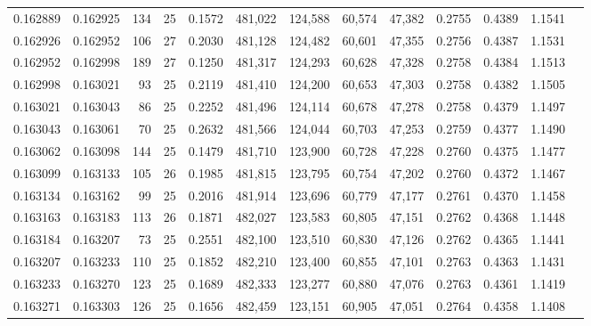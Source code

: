 \begin{tabular}{rrrrrrrrrrrrr}
0.162889 & 0.162925 & 134 &  25 &                                     0.1572 & 481,022 & 124,588 &  60,574 &  47,382 & 0.2755 & 0.4389 & 1.1541 \\
0.162926 & 0.162952 & 106 &  27 &                                     0.2030 & 481,128 & 124,482 &  60,601 &  47,355 & 0.2756 & 0.4387 & 1.1531 \\
0.162952 & 0.162998 & 189 &  27 &                                     0.1250 & 481,317 & 124,293 &  60,628 &  47,328 & 0.2758 & 0.4384 & 1.1513 \\
0.162998 & 0.163021 &  93 &  25 &                                     0.2119 & 481,410 & 124,200 &  60,653 &  47,303 & 0.2758 & 0.4382 & 1.1505 \\
0.163021 & 0.163043 &  86 &  25 &                                     0.2252 & 481,496 & 124,114 &  60,678 &  47,278 & 0.2758 & 0.4379 & 1.1497 \\
0.163043 & 0.163061 &  70 &  25 &                                     0.2632 & 481,566 & 124,044 &  60,703 &  47,253 & 0.2759 & 0.4377 & 1.1490 \\
0.163062 & 0.163098 & 144 &  25 &                                     0.1479 & 481,710 & 123,900 &  60,728 &  47,228 & 0.2760 & 0.4375 & 1.1477 \\
0.163099 & 0.163133 & 105 &  26 &                                     0.1985 & 481,815 & 123,795 &  60,754 &  47,202 & 0.2760 & 0.4372 & 1.1467 \\
0.163134 & 0.163162 &  99 &  25 &                                     0.2016 & 481,914 & 123,696 &  60,779 &  47,177 & 0.2761 & 0.4370 & 1.1458 \\
0.163163 & 0.163183 & 113 &  26 &                                     0.1871 & 482,027 & 123,583 &  60,805 &  47,151 & 0.2762 & 0.4368 & 1.1448 \\
0.163184 & 0.163207 &  73 &  25 &                                     0.2551 & 482,100 & 123,510 &  60,830 &  47,126 & 0.2762 & 0.4365 & 1.1441 \\
0.163207 & 0.163233 & 110 &  25 &                                     0.1852 & 482,210 & 123,400 &  60,855 &  47,101 & 0.2763 & 0.4363 & 1.1431 \\
0.163233 & 0.163270 & 123 &  25 &                                     0.1689 & 482,333 & 123,277 &  60,880 &  47,076 & 0.2763 & 0.4361 & 1.1419 \\
0.163271 & 0.163303 & 126 &  25 &                                     0.1656 & 482,459 & 123,151 &  60,905 &  47,051 & 0.2764 & 0.4358 & 1.1408 \\

\end{tabular}
